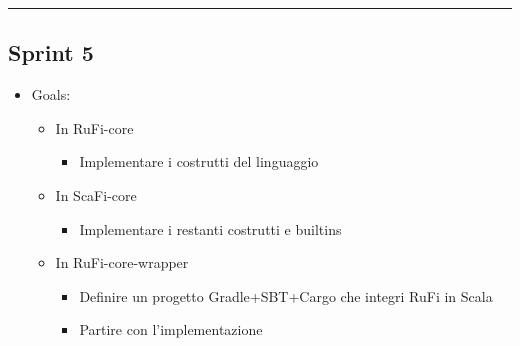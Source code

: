 \documentclass[12pt, a4paper]{article}
\begin{document}
\par\noindent\rule{\textwidth}{0.5pt}

\subsection*{Sprint 5}

\begin{itemize}
    \item Goals:
          \begin{itemize}
              \color{teal}
              \item In RuFi-core
                    \begin{itemize}
                        \item Implementare i costrutti del linguaggio
                    \end{itemize}
                    \color{cyan}
              \item In ScaFi-core
                    \begin{itemize}
                        \item Implementare i restanti costrutti e builtins
                    \end{itemize}
                    \color{teal}
                    \color{magenta}
              \item In RuFi-core-wrapper
                    \begin{itemize}
                        \item Definire un progetto Gradle+SBT+Cargo che integri RuFi in Scala
                        \item Partire con l'implementazione
                    \end{itemize}
                    \color{blue}


\end{itemize}
\end{itemize}
\end{document}
